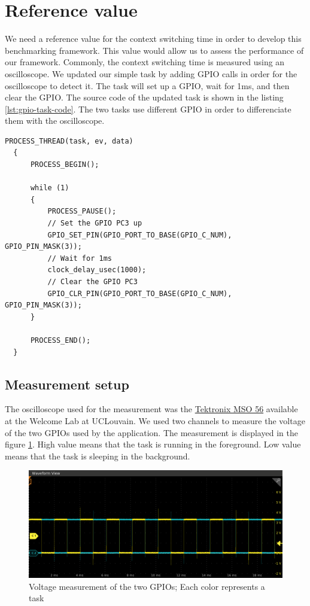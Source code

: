 \section{Reference value}

We need a reference value for the context switching time in order to develop this benchmarking framework.
This value would allow us to assess the performance of our framework.
Commonly, the context switching time is measured using an oscilloscope.
We updated our simple task by adding GPIO calls in order for the oscilloscope to detect it.
The task will set up a GPIO, wait for 1ms, and then clear the GPIO.
The source code of the updated task is shown in the listing \ref{lst:gpio-task-code}.
The two tasks use different GPIO in order to differenciate them with the oscilloscope.

\begin{lstlisting}[style=CStyle, label={lst:gpio-task-code}, caption={Source code of the task with GPIO calls}]
  PROCESS_THREAD(task, ev, data)
  {
      PROCESS_BEGIN();
  
      while (1)
      {
          PROCESS_PAUSE();
          // Set the GPIO PC3 up
          GPIO_SET_PIN(GPIO_PORT_TO_BASE(GPIO_C_NUM), GPIO_PIN_MASK(3));
          // Wait for 1ms
          clock_delay_usec(1000);
          // Clear the GPIO PC3
          GPIO_CLR_PIN(GPIO_PORT_TO_BASE(GPIO_C_NUM), GPIO_PIN_MASK(3));
      }
  
      PROCESS_END();
  }
\end{lstlisting}

\subsection{Measurement setup}

The oscilloscope used for the measurement was the \href{https://www.tek.com/oscilloscope/mso56}{Tektronix MSO 56} available at the Welcome Lab at UCLouvain.
We used two channels to measure the voltage of the two GPIOs used by the application.
The measurement is displayed in the figure \ref{fig:measurement-value-wave}.
High value means that the task is running in the foreground.
Low value means that the task is sleeping in the background.

\begin{figure}[!ht]
  \centering
  \includegraphics[scale=0.5]{assets/measurement-value-wave.png}
  \caption{\label{fig:measurement-value-wave}Voltage measurement of the two GPIOs; Each color represents a task}
\end{figure}

